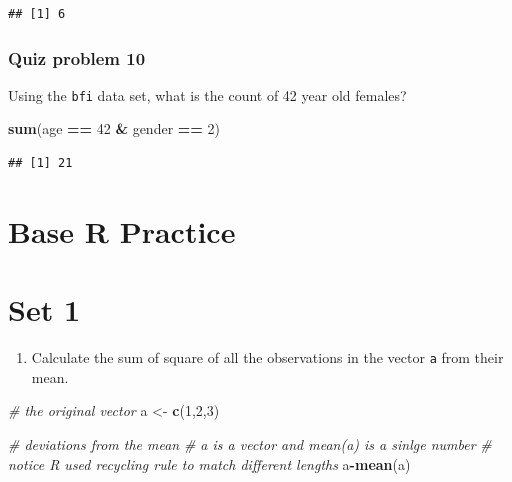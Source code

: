 \documentclass[]{book}
\newenvironment{Shaded}{\begin{snugshade}}{\end{snugshade}}
\newcommand{\CommentTok}[1]{\textcolor[rgb]{0.56,0.35,0.01}{\textit{#1}}}
\newcommand{\DecValTok}[1]{\textcolor[rgb]{0.00,0.00,0.81}{#1}}
\newcommand{\KeywordTok}[1]{\textcolor[rgb]{0.13,0.29,0.53}{\textbf{#1}}}
\newcommand{\NormalTok}[1]{#1}
\newcommand{\OperatorTok}[1]{\textcolor[rgb]{0.81,0.36,0.00}{\textbf{#1}}}
\newcommand{\StringTok}[1]{\textcolor[rgb]{0.31,0.60,0.02}{#1}}
\providecommand{\tightlist}{%
  \setlength{\itemsep}{0pt}\setlength{\parskip}{0pt}}
\begin{document}
\begin{verbatim}
## [1] 6
\end{verbatim}

\hypertarget{quiz-problem-10}{%
\subsection{Quiz problem 10}\label{quiz-problem-10}}

Using the \texttt{bfi} data set, what is the count of 42 year old females?

\begin{Shaded}
\begin{Highlighting}[]
\KeywordTok{sum}\NormalTok{(age }\OperatorTok{==}\StringTok{ }\DecValTok{42} \OperatorTok{&}\StringTok{ }\NormalTok{gender }\OperatorTok{==}\StringTok{ }\DecValTok{2}\NormalTok{)}
\end{Highlighting}
\end{Shaded}

\begin{verbatim}
## [1] 21
\end{verbatim}

\hypertarget{base-r-practice}{%
\chapter{Base R Practice}\label{base-r-practice}}

\hypertarget{set-1}{%
\chapter{Set 1}\label{set-1}}

\begin{enumerate}
\def\labelenumi{\arabic{enumi}.}
\tightlist
\item
  Calculate the sum of square of all the observations in the vector \texttt{a} from their mean.
\end{enumerate}

\begin{Shaded}
\begin{Highlighting}[]
\CommentTok{# the original vector }
\NormalTok{a <-}\StringTok{ }\KeywordTok{c}\NormalTok{(}\DecValTok{1}\NormalTok{,}\DecValTok{2}\NormalTok{,}\DecValTok{3}\NormalTok{)}
\end{Highlighting}
\end{Shaded}

\begin{Shaded}
\begin{Highlighting}[]
\CommentTok{# deviations from the mean}
\CommentTok{# a is a vector and mean(a) is a sinlge number}
\CommentTok{# notice R used recycling rule to match different lengths}
\NormalTok{a}\OperatorTok{-}\KeywordTok{mean}\NormalTok{(a)}
\end{Highlighting}
\end{Shaded}
\end{document}
